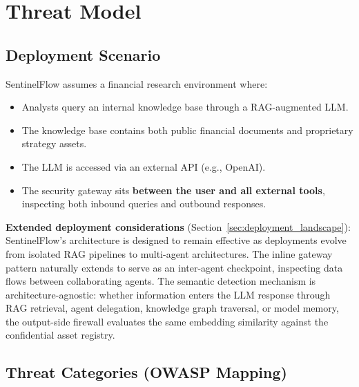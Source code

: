 \documentclass[12pt,a4paper]{article}
\begin{document}
\section{Threat Model}
\label{sec:threat}

\subsection{Deployment Scenario}

SentinelFlow assumes a financial research environment where:
\begin{itemize}[leftmargin=*]
    \item Analysts query an internal knowledge base through a RAG-augmented LLM.
    \item The knowledge base contains both public financial documents and proprietary strategy assets.
    \item The LLM is accessed via an external API (e.g., OpenAI).
    \item The security gateway sits \textbf{between the user and all external tools}, inspecting both inbound queries and outbound responses.
\end{itemize}

\textbf{Extended deployment considerations} (Section~\ref{sec:deployment_landscape}): SentinelFlow's architecture is designed to remain effective as deployments evolve from isolated RAG pipelines to multi-agent architectures. The inline gateway pattern naturally extends to serve as an inter-agent checkpoint, inspecting data flows between collaborating agents. The semantic detection mechanism is architecture-agnostic: whether information enters the LLM response through RAG retrieval, agent delegation, knowledge graph traversal, or model memory, the output-side firewall evaluates the same embedding similarity against the confidential asset registry.

\subsection{Threat Categories (OWASP Mapping)}
\end{document}
